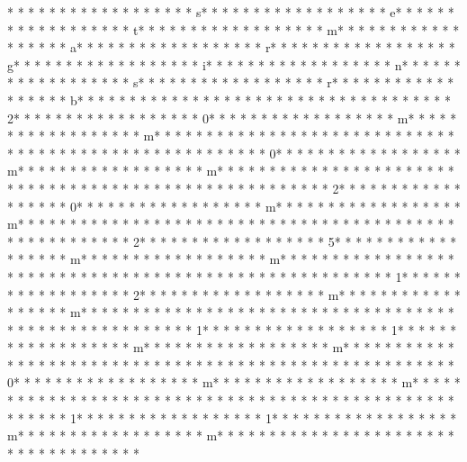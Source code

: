 * * *  * * *  * * *  *  * * *  *  * * *  * s* * *  * * *  * * *  *  * * *  *  * * *  * e* * *  * * *  * * *  *  * * *  *  * * *  * t* * *  * * *  * * *  *  * * *  *  * * *  * m* * *  * * *  * * *  *  * * *  *  * * *  * a* * *  * * *  * * *  *  * * *  *  * * *  * r* * *  * * *  * * *  *  * * *  *  * * *  * g* * *  * * *  * * *  *  * * *  *  * * *  * i* * *  * * *  * * *  *  * * *  *  * * *  * n* * *  * * *  * * *  *  * * *  *  * * *  * s* * *  * * *  * * *  *  * * *  *  * * *  * r* * *  * * *  * * *  *  * * *  *  * * *  * b* * *  * * *  * * *  *  * * *  *  * * *  * {* * *  * * *  * * *  *  * * *  *  * * *  * 2* * *  * * *  * * *  *  * * *  *  * * *  * 0* * *  * * *  * * *  *  * * *  *  * * *  * m* * *  * * *  * * *  *  * * *  *  * * *  * m* * *  * * *  * * *  *  * * *  *  * * *  * }* * *  * * *  * * *  *  * * *  *  * * *  * {* * *  * * *  * * *  *  * * *  *  * * *  * 0* * *  * * *  * * *  *  * * *  *  * * *  * m* * *  * * *  * * *  *  * * *  *  * * *  * m* * *  * * *  * * *  *  * * *  *  * * *  * }* * *  * * *  * * *  *  * * *  *  * * *  * {* * *  * * *  * * *  *  * * *  *  * * *  * 2* * *  * * *  * * *  *  * * *  *  * * *  * 0* * *  * * *  * * *  *  * * *  *  * * *  * m* * *  * * *  * * *  *  * * *  *  * * *  * m* * *  * * *  * * *  *  * * *  *  * * *  * }* * *  * * *  * * *  *  * * *  *  * * *  * {* * *  * * *  * * *  *  * * *  *  * * *  * 2* * *  * * *  * * *  *  * * *  *  * * *  * 5* * *  * * *  * * *  *  * * *  *  * * *  * m* * *  * * *  * * *  *  * * *  *  * * *  * m* * *  * * *  * * *  *  * * *  *  * * *  * }* * *  * * *  * * *  *  * * *  *  * * *  * {* * *  * * *  * * *  *  * * *  *  * * *  * 1* * *  * * *  * * *  *  * * *  *  * * *  * 2* * *  * * *  * * *  *  * * *  *  * * *  * m* * *  * * *  * * *  *  * * *  *  * * *  * m* * *  * * *  * * *  *  * * *  *  * * *  * }* * *  * * *  * * *  *  * * *  *  * * *  * {* * *  * * *  * * *  *  * * *  *  * * *  * 1* * *  * * *  * * *  *  * * *  *  * * *  * 1* * *  * * *  * * *  *  * * *  *  * * *  * m* * *  * * *  * * *  *  * * *  *  * * *  * m* * *  * * *  * * *  *  * * *  *  * * *  * }* * *  * * *  * * *  *  * * *  *  * * *  * {* * *  * * *  * * *  *  * * *  *  * * *  * 0* * *  * * *  * * *  *  * * *  *  * * *  * m* * *  * * *  * * *  *  * * *  *  * * *  * m* * *  * * *  * * *  *  * * *  *  * * *  * }* * *  * * *  * * *  *  * * *  *  * * *  * {* * *  * * *  * * *  *  * * *  *  * * *  * 1* * *  * * *  * * *  *  * * *  *  * * *  * 1* * *  * * *  * * *  *  * * *  *  * * *  * m* * *  * * *  * * *  *  * * *  *  * * *  * m* * *  * * *  * * *  *  * * *  *  * * *  * }* * *  * * *  * * *  *  * * *  *  * * *  * 
